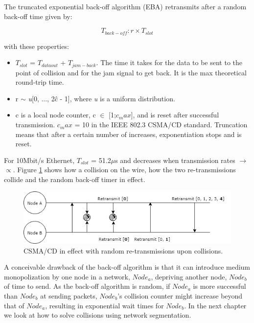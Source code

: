 \noindent The truncated exponential back-off algorithm (EBA) retransmits after a random back-off time given by:

\[ T_{back-off}: r \times T_{slot} \]

\noindent with these properties:

\begin{itemize}
	\item $T_{slot}$ = $T_{dataout}$ + $T_{jam-back}$. The time it takes for the data to be sent to the point of collision and for the jam signal to get back. It is the max theoretical round-trip time.
	\item r $\sim$ \textit{u}[0, ..., 2\^{c} - 1], where \textit{u} is a uniform distribution.
	\item c is a local node counter, c $\in$ [1;$c_max$], and is reset after successful transmission. $c_max$ = 10 in the IEEE 802.3 CSMA/CD standard. Truncation means that after a certain number of increases, exponentiation stops and is reset.
\end{itemize}

\noindent For 10Mbit/s Ethernet, $T_{slot}$ = 51.2$\mu$s and decreases when transmission rates $\longrightarrow$ $\propto$. Figure \ref{fig:csmacd} shows how a collision on the wire, how the two re-transmissions collide and the random back-off timer in effect.

\begin{figure}[h!]\label{}
	\centering
	\includegraphics[scale=0.5]{realTimeEthernet/CSMACD.png}
	\caption{CSMA/CD in effect with random re-transmissions upon collisions.}
	\label{fig:csmacd}
\end{figure}

\noindent A conceivable drawback of the back-off algorithm is that it can introduce medium monopolization by one node in a network, $Node_{a}$, depriving another node, $Node_{b}$ of time to send. As the back-off algorithm is random, if $Node_{a}$ is more successful than $Node_{b}$ at sending packets, $Node_{b}$'s collision counter might increase beyond that of $Node_{a}$, resulting in exponential wait times for $Node_{b}$. In the next chapter we look at how to solve collisions using network segmentation.

